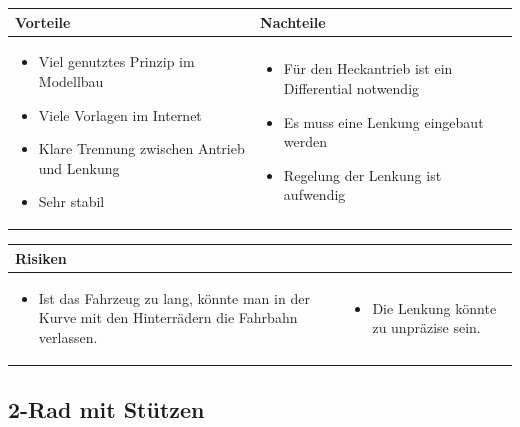 \begin{table}[h]
\begin{tabular}{p{} | p{}}


 \textbf{Vorteile} & \textbf{Nachteile} \\ \hline
	 
\begin{itemize}
\item Viel genutztes Prinzip im Modellbau
\item Viele Vorlagen im Internet
\item Klare Trennung zwischen Antrieb und Lenkung
\item Sehr stabil
\end{itemize}

 
 &
 
\begin{itemize}
\item Für den Heckantrieb ist ein Differential notwendig
\item Es muss eine Lenkung eingebaut werden 
\item Regelung der Lenkung ist aufwendig
\end{itemize}

\end{tabular}
\end{table}

\begin{table}[h]
\begin{tabular}{p{}p{}}


 \textbf{Risiken} & \\ \hline
	 
\begin{itemize}
\item Ist das Fahrzeug zu lang, könnte man in der Kurve mit den Hinterrädern die Fahrbahn verlassen.
\end{itemize}
&
\begin{itemize}
\item Die Lenkung könnte zu unpräzise sein.
\end{itemize}

 
\end{tabular}
\end{table}

\pagebreak


\subsection{2-Rad mit Stützen}

